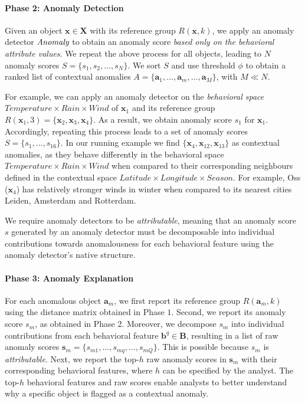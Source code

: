 \documentclass[pdflatex,sn-basic]{sn-jnl}%
\theoremstyle{thmstyleone}%
\newcommand{\anomaly}{\emph{Anomaly}}
\theoremstyle{thmstyletwo}%
\theoremstyle{thmstylethree}%
\begin{document}
\paragraph{Phase 2: Anomaly Detection} Given an object $\mathbf{x} \in \mathbf{X}$ with its reference group $R(\mathbf{x},k)$, we apply an anomaly detector $\anomaly$ to obtain an anomaly score \emph{based only on the behavioral attribute values}. We repeat the above process for all objects, leading to $N$ anomaly scores $S= \{s_{1},s_{2},...,s_{N}\}$. We sort $S$ and use threshold $\phi$ to obtain a ranked list of contextual anomalies $A= \{\mathbf{a}_{1},...,\mathbf{a}_{m},...,\mathbf{a}_{M}\}$, with $M \ll N$.

For example, we can apply an anomaly detector on the \textit{behavioral space} $Temperature \times Rain \times Wind$ of $\mathbf{x}_{1}$ and its reference group $R(\mathbf{x}_{1},3)=\{\mathbf{x}_{2},\mathbf{x}_{3},\mathbf{x}_{4}\}$. As a result, we obtain anomaly score $s_{1}$ for $\mathbf{x}_{1}$. Accordingly, repeating this process leads to a set of anomaly scores $S= \{s_{1},...,s_{16}\}$. In our running example we find $\{\mathbf{x}_{4},\mathbf{x}_{12},\mathbf{x}_{13}\}$ as contextual anomalies, as they behave differently in the behavioral space $Temperature \times Rain \times Wind$ when compared to their corresponding neighbours defined in the contextual space $Latitude \times Longitude \times Season$. For example, Oss ($\mathbf{x}_{4}$) has relatively stronger winds in winter when compared to its nearest cities Leiden, Amsterdam and Rotterdam. 

We require anomaly detectors to be \textit{attributable}, meaning that an anomaly score $s$ generated by an anomaly detector must be decomposable into individual contributions towards anomalousness for each behavioral feature using the anomaly detector's native structure.

\paragraph{Phase 3: Anomaly Explanation} For each anomalous object $\mathbf{a}_{m}$, we first report its reference group $R(\mathbf{a}_{m},k)$ using the distance matrix obtained in Phase $1$. Second, we report its anomaly score $s_{m}$, as obtained in Phase $2$. Moreover, we decompose $s_{m}$ into individual contributions from each behavioral feature $\mathbf{b}^{q} \in \mathbf{B}$, resulting in a list of raw anomaly scores $\mathbf{s}_{m}=\{s_{m1},...,s_{mq},...,s_{mQ}\}$. This is possible because  $s_{m}$ is \emph{attributable}. Next, we report the top-$h$ raw anomaly scores in $\mathbf{s}_{m}$ with their corresponding behavioral features, where $h$ can be specified by the analyst. The top-$h$ behavioral features and raw scores enable analysts to better understand why a specific object is flagged as a contextual anomaly.
\end{document}
